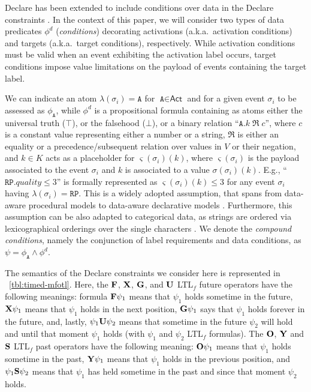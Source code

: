 Declare has been extended to include conditions over data in the Declare constraints \cite{BurattinMS16}. In the context of this paper, we will consider two types of data predicates $\phi^d$ (\textit{conditions}) decorating activations (a.k.a.\ activation conditions) and targets (a.k.a.\ target conditions), respectively.
While activation conditions must be valid when an event exhibiting the activation label occurs, target conditions impose value limitations on the payload of events containing the target label.


We can indicate an atom $\lambda(\sigma_i)=\texttt{A}$ for $\texttt{A}\in\textsf{Act}$ and for a given event $\sigma_i$ to be assessed as $\phi_\texttt{A}$, while $\phi^d$ is a propositional formula containing as atoms either the universal truth ($\top$), or the falsehood ($\bot$), or a binary relation ``$\texttt{A}.k\;\Re\;c$'', where $c$ is a constant value representing either a number or a string, $\Re$ is either an equality or a precedence/subsequent relation over values in $V$ or their negation, and $k\in K$ acts as a placeholder for $\varsigma(\sigma_i)(k)$, where $\varsigma(\sigma_i)$ is the payload associated to the event $\sigma_i$ and $k$ is associated to a value $\sigma(\sigma_i)(k)$. E.g., ``$\texttt{RP}.\textit{quality}\leq 3$'' is formally represented as $\varsigma(\sigma_i)(k)\leq 3$ for any event $\sigma_i$ having $\lambda(\sigma_i)=\texttt{RP}$.  This is a widely adopted assumption, that spans from data-aware procedural models \cite{MultiPerspective} to data-aware declarative models \cite{10.1007/978-3-642-40176-3_8}. Furthermore, this assumption can be also adapted to categorical data, as strings are ordered via lexicographical orderings over the single characters \cite{MultiPerspective}. We denote the \textit{compound conditions}, namely the conjunction of label requirements and data conditions, as $\psi=\phi_{\texttt{A}}\wedge \phi^d$.



The semantics of the Declare constraints we consider here is represented in \tablename~\ref{tbl:timed-mfotl}.
Here, the $\mathbf{F}$, $\mathbf{X}$, $\mathbf{G}$, and $\mathbf{U}$ LTL$_f$ future operators have the following meanings: formula $\mathbf{F} \psi_1$ means that $\psi_1$ holds sometime in the future, $\mathbf{X} \psi_1$ means that $\psi_1$
holds in the next position, $\mathbf{G} \psi_1$ says that $\psi_1$ holds forever in the future, and, lastly, $\psi_1 \mathbf{U} \psi_2$ means that sometime in the future $\psi_2$ will hold and
until that moment $\psi_1$ holds (with $\psi_1$ and $\psi_2$ LTL$_f$ formulas).
The $\mathbf{O}$, $\mathbf{Y}$ and $\mathbf{S}$ LTL$_f$ past operators have the following meaning:
$\mathbf{O} \psi_1$ means that $\psi_1$ holds sometime in the past,
$\mathbf{Y} \psi_1$ means that $\psi_1$ holds in the previous position,
and $\psi_1 \mathbf{S} \psi_2$ means that $\psi_1$ has held sometime in the past and since that moment $\psi_2$ holds.

